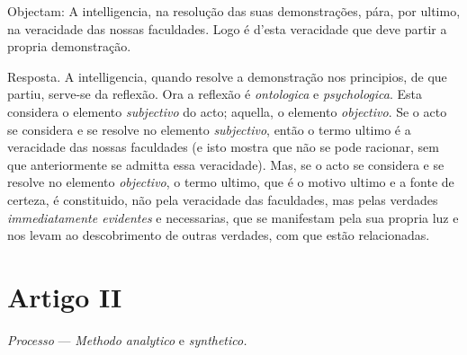 Objectam: A intelligencia, na resolução das suas demonstrações, pára, por ultimo, na veracidade das nossas faculdades. Logo é d'esta veracidade que deve partir a propria demonstração.

Resposta. A intelligencia, quando resolve a demonstração nos principios, de que partiu, serve-se da reflexão. Ora a reflexão é \emph{ontologica} e \emph{psychologica}. Esta considera o elemento \emph{subjectivo} do acto; aquella, o elemento \emph{objectivo}. Se o acto se considera e se resolve no elemento \emph{subjectivo}, então o termo ultimo é a veracidade das nossas faculdades (e isto mostra que não se pode racionar, sem que anteriormente se admitta essa veracidade). Mas, se o acto se considera e se resolve no elemento \emph{objectivo}, o termo ultimo, que é o motivo ultimo e a fonte de certeza, é constituido, não pela veracidade das faculdades, mas pelas verdades \emph{immediatamente evidentes} e necessarias, que se manifestam pela sua propria luz e nos levam ao descobrimento de outras verdades, com que estão relacionadas.


\section*{Artigo II}

     \emph{Processo} --- \emph{Methodo analytico} e \emph{synthetico.}


